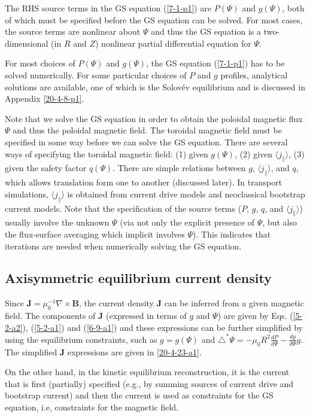 \documentclass{llncs}
\begin{document}
The RHS source terms in the GS equation (\ref{7-1-p1}) are $P (\Psi)$ and $g
(\Psi)$, both of which must be specified before the GS equation can be solved.
For most cases, the source terms are nonlinear about $\Psi$ and thus the GS
equation is a two-dimensional (in $R$ and $Z$) nonlinear partial differential
equation for $\Psi$.

For most choices of $P (\Psi)$ and $g (\Psi)$, the GS equation (\ref{7-1-p1})
has to be solved numerically. For some particular choices of $P$ and $g$
profiles, analytical solutions are available, one of which is the Solov{\'e}v
equilibrium and is discussed in Appendix \ref{20-4-8-p1}.

Note that we solve the GS equation in order to obtain the poloidal magnetic
flux $\Psi$ and thus the poloidal magnetic field. The toroidal magnetic field
must be specified in some way before we can solve the GS equation. There are
several ways of specifying the toroidal magnetic field: (1) given $g (\Psi)$,
(2) given $\langle j_{\parallel} \rangle$, (3) given the safety factor $q
(\Psi)$. There are simple relations between $g$, $\langle j_{\parallel}
\rangle$, and $q$, which allows translation form one to another (discussed
later). In transport simulations, $\langle j_{\parallel} \rangle$ is obtained
from current drive models and neoclassical bootstrap current models. Note that
the specification of the source terms ($P$, $g$, $q$, and $\langle
j_{\parallel} \rangle$) usually involve the unknown $\Psi$ (via not only the
explicit presence of $\Psi$, but also the flux-surface averaging which
implicit involves $\Psi$). This indicates that iterations are needed when
numerically solving the GS equation.

\subsection{Axisymmetric equilibrium current density}

Since $\mathbf{J}= \mu_0^{- 1} \nabla \times \mathbf{B}$, the current density
$\mathbf{J}$ can be inferred from a given magnetic field. The components of
$\mathbf{J}$ (expressed in terms of $g$ and $\Psi$) are given by Eqs.
(\ref{5-2-a2}), (\ref{5-2-a1}) and (\ref{6-9-a1}) and these expressions can be
further simplified by using the equilibrium constraints, such as $g = g
(\Psi)$ and $\triangle^{\ast} \Psi = - \mu_0 R^2 \frac{d P}{d \Psi} - \frac{d
g}{d \Psi} g$. The simplified $\mathbf{J}$ expressions are given in
\ref{20-4-23-a1}.

On the other hand, in the kinetic equilibrium reconstruction{\cite{li2013}},
it is the current that is first (partially) specified (e.g., by summing
sources of current drive and bootstrap current) and then the current is used
as constraints for the GS equation, i.e, constraints for the magnetic field.
\end{document}

